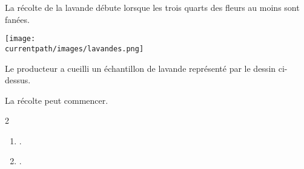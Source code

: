 \begin{exercice*}
    La récolte de la lavande débute lorsque les trois quarts des fleurs au moins sont fanées.

    \begin{center}
        \texttt{[image: \\currentpath/images/lavandes.png]}
    \end{center}

    Le producteur a cueilli un échantillon de lavande représenté par le dessin ci-dessus.

    La récolte peut commencer.    
\end{exercice*}
\begin{corrige}
    \phantom{rrr}    
    \begin{multicols}2
        \begin{enumerate}
            \item .
            \item .
        \end{enumerate}
    \end{multicols}
\end{corrige}

